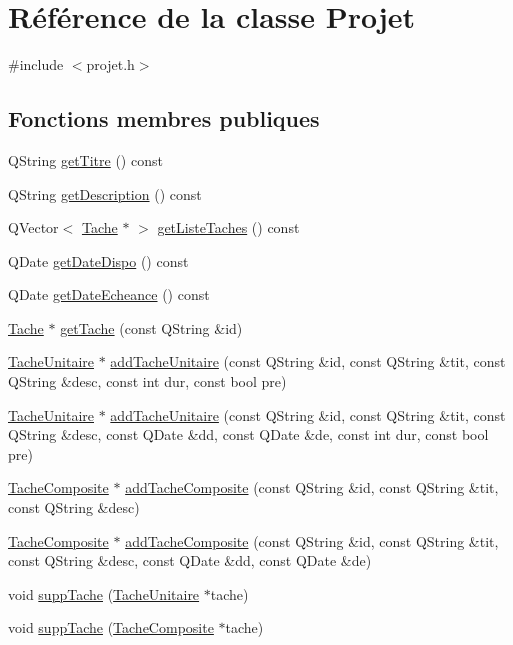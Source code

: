 \hypertarget{class_projet}{}\section{Référence de la classe Projet}
\label{class_projet}


{\ttfamily \#include $<$projet.\+h$>$}

\subsection*{Fonctions membres publiques}
\begin{DoxyCompactItemize}
\item 
Q\+String \hyperlink{class_projet_aafdae1361272085ee8683738d70d0612}{get\+Titre} () const 
\item 
Q\+String \hyperlink{class_projet_a4b939075b8f652846f8fc6457343219e}{get\+Description} () const 
\item 
Q\+Vector$<$ \hyperlink{class_tache}{Tache} $\ast$ $>$ \hyperlink{class_projet_abc5c0c5980be9a1639651dc23789f068}{get\+Liste\+Taches} () const 
\item 
Q\+Date \hyperlink{class_projet_a226d910000aaecf7e44399f2226496f5}{get\+Date\+Dispo} () const 
\item 
Q\+Date \hyperlink{class_projet_a6a54a69a00cbaebd362e02f8e7dc3803}{get\+Date\+Echeance} () const 
\item 
\hyperlink{class_tache}{Tache} $\ast$ \hyperlink{class_projet_a4bd470370df8fd883386069a90b958e2}{get\+Tache} (const Q\+String \&id)
\item 
\hyperlink{class_tache_unitaire}{Tache\+Unitaire} $\ast$ \hyperlink{class_projet_a3dfe2bda911378a958b57a6684624804}{add\+Tache\+Unitaire} (const Q\+String \&id, const Q\+String \&tit, const Q\+String \&desc, const int dur, const bool pre)
\item 
\hyperlink{class_tache_unitaire}{Tache\+Unitaire} $\ast$ \hyperlink{class_projet_a8434e7255cace66ff199cb0ba6636535}{add\+Tache\+Unitaire} (const Q\+String \&id, const Q\+String \&tit, const Q\+String \&desc, const Q\+Date \&dd, const Q\+Date \&de, const int dur, const bool pre)
\item 
\hyperlink{class_tache_composite}{Tache\+Composite} $\ast$ \hyperlink{class_projet_aa5f49aee0f30445f1e612311848b78ba}{add\+Tache\+Composite} (const Q\+String \&id, const Q\+String \&tit, const Q\+String \&desc)
\item 
\hyperlink{class_tache_composite}{Tache\+Composite} $\ast$ \hyperlink{class_projet_aee6a754a368eb0ea47b2fa7317ea5055}{add\+Tache\+Composite} (const Q\+String \&id, const Q\+String \&tit, const Q\+String \&desc, const Q\+Date \&dd, const Q\+Date \&de)
\item 
void \hyperlink{class_projet_a649b8123c195bc575871576c9f350d14}{supp\+Tache} (\hyperlink{class_tache_unitaire}{Tache\+Unitaire} $\ast$tache)
\item 
void \hyperlink{class_projet_a1af5c7716e8893066418afc5e8c09f3c}{supp\+Tache} (\hyperlink{class_tache_composite}{Tache\+Composite} $\ast$tache)
\end{DoxyCompactItemize}
